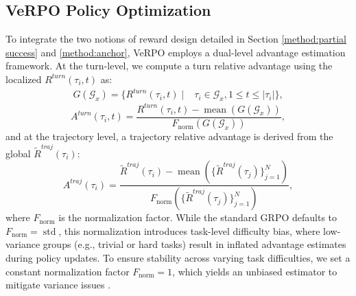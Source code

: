 \documentclass[11pt]{article}
\begin{document}
\subsection{VeRPO Policy Optimization}
To integrate the two notions of reward design detailed in Section \ref{method:partial success} and \ref{method:anchor}, VeRPO employs a dual-level advantage estimation framework. At the turn-level, we compute a turn relative advantage using the localized $R^{turn}(\tau_i, t)$ as:
\begin{equation}
\begin{split}
  G(\mathcal{G}_x) = \{R^{turn}(\tau_{i}, t) \mid & \tau_{i} \in \mathcal{G}_x,  1 \leq t \leq |\tau_{i}|\},
\end{split}
\end{equation}
\begin{equation}
  A^{turn}(\tau_i, t) = \frac{R^{turn}(\tau_i, t) - \operatorname{mean}(G(\mathcal{G}_x))}{F_{\operatorname{norm}}(G(\mathcal{G}_x))},
\end{equation}
and at the trajectory level, a trajectory relative advantage is derived from the global $\tilde{R}^{traj}(\tau_{i})$: 
\begin{equation}
A^{traj}(\tau_{i}) = \frac{\tilde{R}^{traj}(\tau_{i}) - \operatorname{mean}(\{\tilde{R}^{traj}(\tau_{j})\}_{j=1}^N)}{F_{\operatorname{norm}}(\{\tilde{R}^{traj}(\tau_{j})\}_{j=1}^N)},
\end{equation}
where $F_{\operatorname{norm}}$ is the normalization factor. While the standard GRPO defaults to $F_{\text{norm}} = \operatorname{std}$, this normalization introduces task-level difficulty bias, where low-variance groups (e.g., trivial or hard tasks) result in inflated advantage estimates during policy updates.
To ensure stability across varying task difficulties, we set a constant normalization factor $F_{\text{norm}} = 1$, which yields an unbiased estimator to mitigate variance issues \cite{liu2025understandingr1-zero-likeTraining}.
\end{document}
